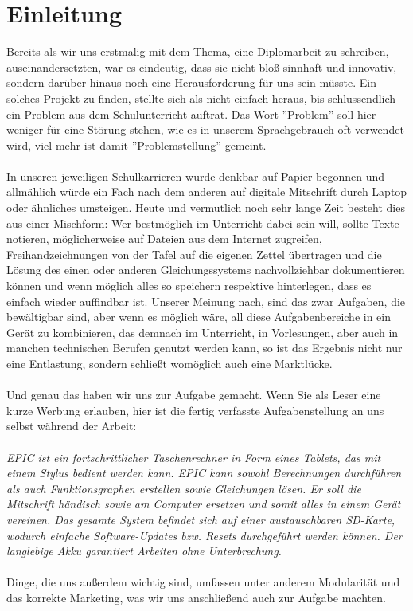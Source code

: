 \section{Einleitung}
Bereits als wir uns erstmalig mit dem Thema, eine Diplomarbeit zu schreiben, auseinandersetzten, war es eindeutig, dass sie nicht bloß sinnhaft und innovativ, sondern darüber hinaus noch eine Herausforderung für uns sein müsste. Ein solches Projekt zu finden, stellte sich als nicht einfach heraus, bis schlussendlich ein Problem aus dem Schulunterricht auftrat. Das Wort ''Problem'' soll hier weniger für eine Störung stehen, wie es in unserem Sprachgebrauch oft verwendet wird, viel mehr ist damit ''Problemstellung'' gemeint.\\\\
In unseren jeweiligen Schulkarrieren wurde denkbar auf Papier begonnen und allmählich würde ein Fach nach dem anderen auf  digitale Mitschrift durch Laptop oder ähnliches umsteigen. Heute und vermutlich noch sehr lange Zeit besteht dies aus einer Mischform: Wer bestmöglich im Unterricht dabei sein will, sollte Texte notieren, möglicherweise auf Dateien aus dem Internet zugreifen, Freihandzeichnungen von der Tafel auf die eigenen Zettel übertragen und die Lösung des einen oder anderen Gleichungssystems nachvollziehbar dokumentieren können und wenn möglich alles so speichern respektive hinterlegen, dass es einfach wieder auffindbar ist. Unserer Meinung nach, sind das zwar Aufgaben, die bewältigbar sind, aber wenn es möglich wäre, all diese Aufgabenbereiche in ein Gerät zu kombinieren, das demnach im Unterricht, in Vorlesungen, aber auch in manchen technischen Berufen genutzt werden kann, so ist das Ergebnis nicht nur eine Entlastung, sondern schließt womöglich auch eine Marktlücke.\\\\
Und genau das haben wir uns zur Aufgabe gemacht. Wenn Sie als Leser eine kurze Werbung erlauben, hier ist die fertig verfasste Aufgabenstellung an uns selbst während der Arbeit:\\\\
\textit{EPIC ist ein fortschrittlicher Taschenrechner in Form eines Tablets, das mit einem Stylus bedient werden kann. EPIC kann sowohl Berechnungen durchführen als auch Funktionsgraphen erstellen sowie Gleichungen lösen. Er soll die Mitschrift händisch sowie am Computer ersetzen und somit alles in einem Gerät vereinen. Das gesamte System befindet sich auf einer austauschbaren SD-Karte, wodurch einfache Software-Updates bzw. Resets durchgeführt werden können. Der langlebige Akku garantiert Arbeiten ohne Unterbrechung.}\\\\
Dinge, die uns außerdem wichtig sind, umfassen unter anderem Modularität und das korrekte Marketing, was wir uns anschließend auch zur Aufgabe machten.

